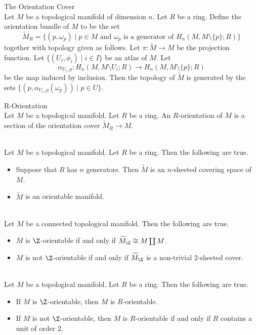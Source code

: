 \documentclass[a4paper]{article}
\begin{document}
\begin{defn}{The Orientation Cover}{}\\
Let $M$ be a topological manifold of dimension $n$. Let $R$ be a ring. Define the orientation bundle of $M$ to be the set $$\widetilde{M}_R=\{(p,\omega_p)\;|\;p\in M\text{ and }\omega_p\text{ is a generator of }H_n(M,M\setminus\{p\};R)\}$$ together with topology given as follows. Let $\pi:\widetilde{M}\to M$ be the projection function. Let $\{(U_i,\phi_i)\;|\;i\in I\}$ be an atlas of $M$. Let $$\alpha_{U_i,p}:H_n(M,M\setminus U_i;R)\to H_n(M,M\setminus\{p\};R)$$ be the map induced by inclusion. Then the topology of $\widetilde{M}$ is generated by the sets $\{(p,\alpha_{U_i,p}(\omega_p))\;|\;p\in U\}$. 
\end{defn}

\begin{defn}{R-Orientation}{}\\
Let $M$ be a topological manifold. Let $R$ be a ring. An $R$-orientation of $M$ is a section of the orientation cover $\widetilde{M}_R\to M$. 
\end{defn}

\begin{prp}{}{}\\
Let $M$ be a topological manifold. Let $R$ be a ring. Then the following are true. 
\begin{itemize}
\item Suppose that $R$ has $n$ generators. Then $\widetilde{M}$ is an $n$-sheeted covering space of $M$. 
\item $\widetilde{M}$ is an orientable manifold. 
\end{itemize}
\end{prp}

\begin{prp}{}{}\\
Let $M$ be a connected topological manifold. Then the following are true. 
\begin{itemize}
\item $M$ is $\Z$-orientable if and only if $\widetilde{M}_\Z\cong M\coprod M$. 
\item $M$ is not $\Z$-orientable if and only if $\widetilde{M}_\Z$ is a non-trivial $2$-sheeted cover. 
\end{itemize}
\end{prp}

\begin{prp}{}{}\\
Let $M$ be a topological manifold. Let $R$ be a ring. Then the following are true. 
\begin{itemize}
\item If $M$ is $\Z$-orientable, then $M$ is $R$-orientable. 
\item If $M$ is not $\Z$-orientable, then $M$ is $R$-orientable if and only if $R$ contains a unit of order $2$. 
\end{itemize}
\end{prp}
\end{document}
